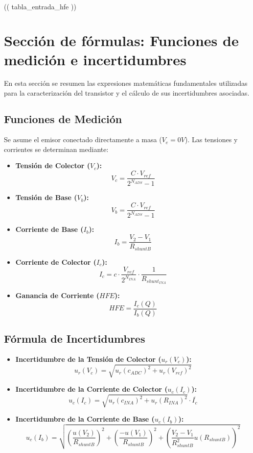 \documentclass[12pt]{article}
\begin{document}
\begin{center}
    \vspace{-0.5cm}
    {\small (( tabla_entrada_hfe )) }
\end{center}



\clearpage

\section*{Sección de fórmulas: Funciones de medición e incertidumbres}
\noindent En esta sección se resumen las expresiones matemáticas fundamentales utilizadas para la caracterización del transistor y el cálculo de sus incertidumbres asociadas.

\subsection*{Funciones de Medición}
Se asume el emisor conectado directamente a masa ($V_e = 0V$). Las tensiones y corrientes se determinan mediante:

\begin{itemize}
    \item \textbf{Tensión de Colector ($V_c$):} 
    \[ V_c = \frac{C \cdot V_{ref}}{2^{N_{ADS}}-1} \]
    \item \textbf{Tensión de Base ($V_b$):} 
    \[ V_b = \frac{C \cdot V_{ref}}{2^{N_{ADS}}-1} \]
    \item \textbf{Corriente de Base ($I_b$):} 
    \[ I_b = \frac{V_2 - V_1}{R_{shuntB}} \] 
    \item \textbf{Corriente de Colector ($I_c$):} 
    \[ I_c = c \cdot \frac{V_{ref}}{2^{N_{INA}}} \cdot \frac{1}{R_{shunt_{INA}}} \] 
    \item \textbf{Ganancia de Corriente ($HFE$):} 
    \[ HFE = \frac{I_c(Q)}{I_b(Q)} \] 
\end{itemize}

\subsection*{Fórmula de Incertidumbres}

\begin{itemize}
    \item \textbf{Incertidumbre de la Tensión de Colector ($u_r(V_c)$):} 
    \[ u_r(V_c) = \sqrt{u_r(c_{ADC})^2 + u_r(V_{ref})^2} \]
    \item \textbf{Incertidumbre de la Corriente de Colector ($u_c(I_c)$):} 
    \[ u_c(I_c) = \sqrt{u_r(c_{INA})^2 + u_r(R_{INA})^2} \cdot \overline{I_c} \]
    \item \textbf{Incertidumbre de la Corriente de Base ($u_c(I_b)$):} 
    \[ u_c(I_b) = \sqrt{\left(\frac{u(V_2)}{R_{shuntB}}\right)^2 + \left(\frac{-u(V_1)}{R_{shuntB}}\right)^2 + \left(\frac{V_2-V_1}{R_{shuntB}^2} u(R_{shuntB})\right)^2} \]
\end{itemize}
\end{document}
